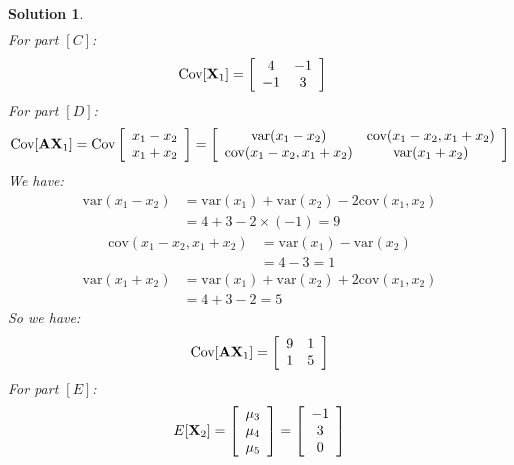 \documentclass[11pt]{article}\usepackage[]{graphicx}\usepackage[]{color}
\newtheorem{sol}{Solution}
\begin{document}
\begin{sol}
\begin{align*}
	\end{align*}
	For part $[C]$:
	\begin{align*}
		\text{Cov}[{\bf X}_1] &=   \left[\begin{array}{cc}4 & -1\\ -1&3\end{array}\right]
	\end{align*}
	For part $[D]$:
	\begin{align*}
		\text{Cov}[{\bf A}{\bf X}_1] = \text{Cov}\left[\begin{array}{c} x_1 - x_2\\ x_1 + x_2\end{array}\right] = \left[\begin{array}{cc} \text{var}(x_1 - x_2)& \text{cov}(x_1 - x_2, x_1 + x_2)\\ \text{cov}(x_1 - x_2, x_1 + x_2)& \text{var}(x_1 + x_2)\end{array}\right]
	\end{align*}
	We have:
	\begin{align*}
		\text{var}(x_1 - x_2) &= \text{var}(x_1) + \text{var}(x_2) - 2\text{cov}(x_1, x_2)\\
		&= 4 + 3 - 2\times(-1) = 9
	\end{align*}
	\begin{align*}
		\text{cov}(x_1 - x_2, x_1 + x_2) &= \text{var}(x_1) - \text{var}(x_2) \\
		&= 4 - 3 = 1
	\end{align*}
	\begin{align*}
		\text{var}(x_1 + x_2) &= \text{var}(x_1) + \text{var}(x_2) + 2\text{cov}(x_1, x_2)\\
		&= 4 + 3 - 2 = 5
	\end{align*}
	So we have:
	\begin{align*}
		\text{Cov}[{\bf A}{\bf X}_1] = \left[\begin{array}{cc} 9& 1\\ 1&5\end{array}\right]
	\end{align*}
	For part $[E]$:
	\begin{align*}
		E[{\bf X}_2] = \left[\begin{array}{c} \mu_3\\ \mu_4\\ \mu_5\end{array}\right] = \left[\begin{array}{c} -1\\ 3\\ 0\end{array}\right] 

\end{align*}
\end{sol}
\end{document}
